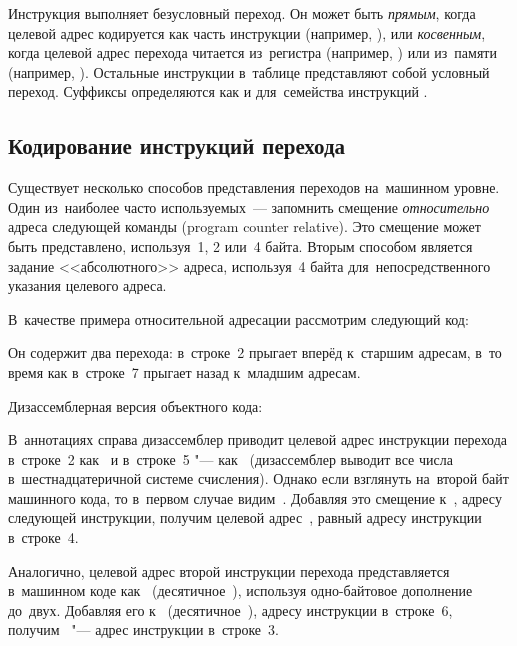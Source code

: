 Инструкция  выполняет безусловный переход. Он может быть \emph{прямым}, когда целевой адрес кодируется как часть инструкции (например, ), или \emph{косвенным}, когда целевой адрес перехода читается из~регистра (например, ) или из~памяти (например, ). Остальные инструкции в~таблице представляют собой условный переход. Суффиксы определяются как и для~семейства инструкций .



\subsection{Кодирование инструкций перехода}
Существует несколько способов представления переходов на~машинном уровне. Один из~наиболее часто используемых~--- запомнить смещение \emph{относительно} адреса следующей команды (\textenglish{program counter relative}). Это смещение может быть представлено, используя~1, 2 или~4 байта. Вторым способом является задание <<абсолютного>> адреса, используя~4 байта для~непосредственного указания целевого адреса.

В~качестве примера относительной адресации рассмотрим следующий код:


Он содержит два перехода:  в~строке~2 прыгает вперёд к~старшим адресам, в~то время как  в~строке~7 прыгает назад к~младшим адресам.

Дизассемблерная версия объектного кода:


В~аннотациях справа дизассемблер приводит целевой адрес инструкции перехода в~строке~2 как~ и в~строке~5 "--- как~ (дизассемблер выводит все числа в~шестнадцатеричной системе счисления). Однако если взглянуть на~второй байт машинного кода, то в~первом случае видим~. Добавляя это смещение к~, адресу следующей инструкции, получим целевой адрес~, равный адресу инструкции в~строке~4.

Аналогично, целевой адрес второй инструкции перехода представляется в~машинном коде как~ (десятичное~), используя одно-байтовое дополнение до~двух. Добавляя его к~ (десятичное~), адресу инструкции в~строке~6, получим~ "--- адрес инструкции в~строке~3.

